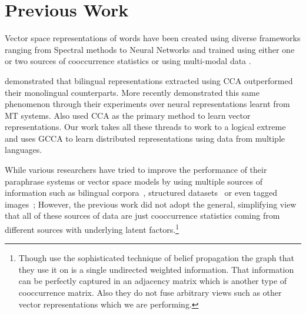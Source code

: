 \section{Previous Work}
\label{sec:previouswork}
Vector space representations of words have been created using diverse
 frameworks ranging from Spectral methods
 \cite{dhillon2011multi,dhillon2012two}
 to Neural Networks
 \cite{mikolov2013efficient,mikolov2013distributed,collobert2013word}
 and trained using either one
 \cite{pennington2014glove}
 or two sources of cooccurrence statistics
 \cite{zou2013bilingual,faruqui2014improving,bansal2014tailoring,levy2014dependency}
 or using multi-modal data
 \cite{felix2014learning,bruni2012distributional}.
 
\cite{faruqui2014improving} demonstrated that bilingual
representations extracted using CCA outperformed their monolingual 
counterparts.
More recently \cite{hill2014not} demonstrated this same
phenomenon through their experiments over neural representations learnt from MT
systems. Also \cite{dhillon2011multi,dhillon2012two} used
CCA as the primary method to learn vector representations. Our work
takes all these threads to work to a logical extreme and uses GCCA to learn distributed
representations using data from multiple languages.

While various researchers have tried to improve the
performance of their paraphrase systems or vector space models by using
multiple sources of information such as bilingual
corpora~\cite{bannard2005paraphrasing,Huang2012Improving,zou2013bilingual}, 
structured datasets~\cite{yu2014improving,faruqui2014retrofitting} or even
tagged images~\cite{bruni2012distributional}; 
However, the previous
work did not adopt the general, simplifying view that 
all of these sources of data are just cooccurrence 
statistics coming from different sources with underlying latent
factors.\footnote{Though \cite{faruqui2014retrofitting} use
  the sophisticated technique of belief propagation the graph that
  they use it on is a single undirected weighted information. That
  information can be perfectly captured in an adjacency matrix which is another type of
cooccurrence matrix. Also they do not fuse arbitrary views such as
other vector representations which we are performing.}


